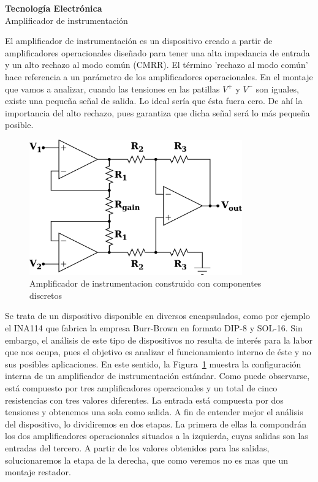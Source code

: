 \documentclass[a4paper,titlepage]{article}
\begin{document}
\begin{center}
\LARGE{\textbf{Tecnología Electrónica}}\\
\LARGE{Amplificador de instrumentación}
\end{center}


El amplificador de instrumentación es un dispositivo creado a partir de amplificadores operacionales diseñado para tener una alta impedancia de entrada y un alto rechazo al modo común (CMRR).
El término 'rechazo al modo común' hace referencia a un parámetro de los amplificadores operacionales. En el montaje que vamos a analizar, cuando las tensiones en las patillas $V^{+}$ y $V^{-}$ son iguales,
existe una pequeña señal de salida. Lo ideal sería que ésta fuera cero. De ahí la importancia del alto rechazo, pues garantiza que dicha señal será lo más pequeña posible.

\begin{figure}[!ht]
 \begin{center}
  \includegraphics[width=260pt]{./Opampinstrumentation.png}
  \caption{Amplificador de instrumentacion construido con componentes discretos}
  \label{AO_inst}
 \end{center}
\end{figure}

Se trata de un dispositivo disponible en diversos encapsulados, como por ejemplo el INA114 que fabrica la empresa Burr-Brown en formato DIP-8 y SOL-16. Sin embargo, el análisis de este tipo de dispositivos no
resulta de interés para la labor que nos ocupa, pues el objetivo es analizar el funcionamiento interno de éste y no sus posibles aplicaciones. En este sentido, la Figura~\ref{AO_inst} muestra la configuración
interna de un amplificador de instrumentación estándar. Como puede observarse, está compuesto por tres amplificadores operacionales y un total de cinco resistencias con tres valores diferentes. La entrada está
compuesta por dos tensiones y obtenemos una sola como salida. A fin de entender mejor el análisis del dispositivo, lo dividiremos en dos etapas. La primera de ellas la compondrán los dos amplificadores operacionales
situados a la izquierda, cuyas salidas son las entradas del tercero. A partir de los valores obtenidos para las salidas, solucionaremos la etapa de la derecha, que como veremos no es mas que un montaje restador.
\end{document}
